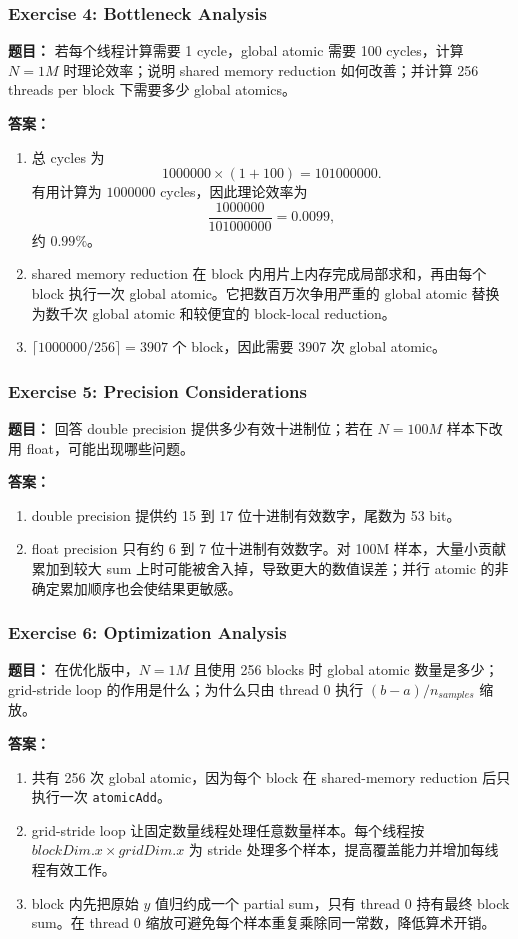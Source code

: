 \documentclass[10pt,a4paper]{article}
\begin{document}
\subsubsection{Exercise 4: Bottleneck Analysis}
\noindent\textbf{题目：} 若每个线程计算需要 1 cycle，global atomic 需要 100 cycles，计算 $N=1M$ 时理论效率；说明 shared memory reduction 如何改善；并计算 256 threads per block 下需要多少 global atomics。

\noindent\textbf{答案：}
\begin{enumerate}[label=\arabic*.]
\item 总 cycles 为
\[
1000000\times(1+100)=101000000.
\]
有用计算为 $1000000$ cycles，因此理论效率为
\[
\frac{1000000}{101000000}=0.0099,
\]
约 $0.99\%$。
\item shared memory reduction 在 block 内用片上内存完成局部求和，再由每个 block 执行一次 global atomic。它把数百万次争用严重的 global atomic 替换为数千次 global atomic 和较便宜的 block-local reduction。
\item $\lceil1000000/256\rceil=3907$ 个 block，因此需要 3907 次 global atomic。
\end{enumerate}

\subsubsection{Exercise 5: Precision Considerations}
\noindent\textbf{题目：} 回答 double precision 提供多少有效十进制位；若在 $N=100M$ 样本下改用 float，可能出现哪些问题。

\noindent\textbf{答案：}
\begin{enumerate}[label=\arabic*.]
\item double precision 提供约 15 到 17 位十进制有效数字，尾数为 53 bit。
\item float precision 只有约 6 到 7 位十进制有效数字。对 100M 样本，大量小贡献累加到较大 sum 上时可能被舍入掉，导致更大的数值误差；并行 atomic 的非确定累加顺序也会使结果更敏感。
\end{enumerate}

\subsubsection{Exercise 6: Optimization Analysis}
\noindent\textbf{题目：} 在优化版中，$N=1M$ 且使用 256 blocks 时 global atomic 数量是多少；grid-stride loop 的作用是什么；为什么只由 thread 0 执行 $(b-a)/n_{samples}$ 缩放。

\noindent\textbf{答案：}
\begin{enumerate}[label=\arabic*.]
\item 共有 256 次 global atomic，因为每个 block 在 shared-memory reduction 后只执行一次 \texttt{atomicAdd}。
\item grid-stride loop 让固定数量线程处理任意数量样本。每个线程按 $blockDim.x\times gridDim.x$ 为 stride 处理多个样本，提高覆盖能力并增加每线程有效工作。
\item block 内先把原始 $y$ 值归约成一个 partial sum，只有 thread 0 持有最终 block sum。在 thread 0 缩放可避免每个样本重复乘除同一常数，降低算术开销。
\end{enumerate}
\end{document}
